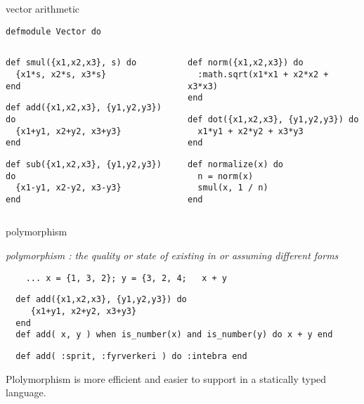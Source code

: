 \begin{frame}[fragile]{vector arithmetic}

\begin{verbatim}
defmodule Vector do
\end{verbatim}


\begin{columns}
  \begin{column}{0.5\linewidth}
  \begin{verbatim}
def smul({x1,x2,x3}, s) do
  {x1*s, x2*s, x3*s}
end
  \end{verbatim}
\pause
  \begin{verbatim}
def add({x1,x2,x3}, {y1,y2,y3}) do
  {x1+y1, x2+y2, x3+y3}
end
  \end{verbatim}
\pause
  \begin{verbatim}
def sub({x1,x2,x3}, {y1,y2,y3}) do
  {x1-y1, x2-y2, x3-y3}
end
  \end{verbatim}
  \end{column}

  \pause

  \begin{column}{0.5\linewidth}
  \begin{verbatim}
def norm({x1,x2,x3}) do
  :math.sqrt(x1*x1 + x2*x2 + x3*x3)
end
  \end{verbatim}
  \begin{verbatim}
def dot({x1,x2,x3}, {y1,y2,y3}) do
  x1*y1 + x2*y2 + x3*y3
end
  \end{verbatim}
\pause
  \begin{verbatim}
def normalize(x) do
  n = norm(x)
  smul(x, 1 / n)
end
  \end{verbatim}
  \end{column}
 \end{columns}

\end{frame}

\begin{frame}[fragile]{polymorphism}

\pause
{\em polymorphism : the quality or state of existing in or assuming different forms}

\pause

\begin{verbatim}
    ... x = {1, 3, 2}; y = {3, 2, 4;   x + y 
\end{verbatim}

\pause

\begin{verbatim}
  def add({x1,x2,x3}, {y1,y2,y3}) do
     {x1+y1, x2+y2, x3+y3}
  end
  def add( x, y ) when is_number(x) and is_number(y) do x + y end
\end{verbatim}\pause
\begin{verbatim}
  def add( :sprit, :fyrverkeri ) do :intebra end
\end{verbatim} 

\pause
\vspace{20pt}
Plolymorphism is more efficient and easier to support in a statically typed language. 

\end{frame}

